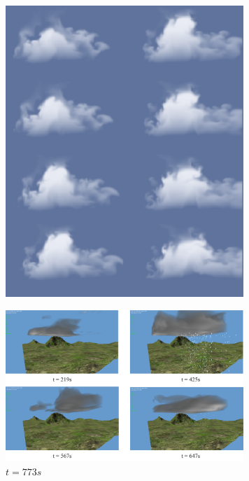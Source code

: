 \begin{figure}[h!]
	\centering
	\includegraphics[width=90mm]{images/Simulation_of_Cloud_Dynamics_on_Graphics_Hardware.PNG}
	\caption{\citet{HarrisEtAl03}}
	\label{fig:Simulation_of_Cloud_Dynamics_on_Graphics_Hardware}
\end{figure}

\begin{figure}[ht!]
	\centering
	\includegraphics[width=90mm]{images/visualcomp.png}
	\caption{$t = 773s$}
	\label{fig:vcom_two}
\end{figure}